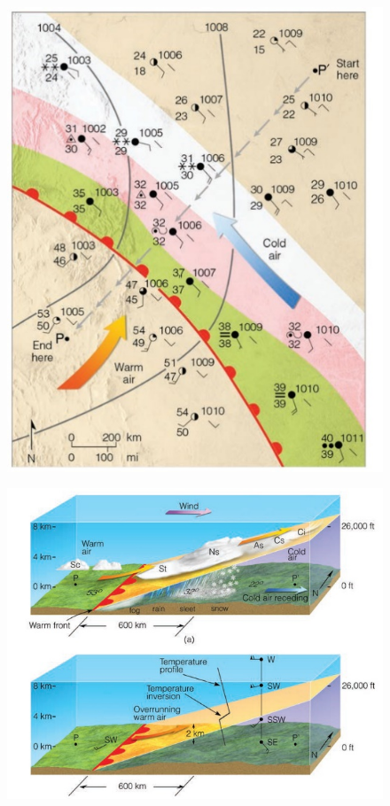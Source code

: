 \documentclass[12pt,oneside]{book}
\begin{document}
\begin{figure}

{\centering \includegraphics[width=0.8\linewidth]{figures/Figure624a} 

}

\caption{ }\label{fig:Fig624a}
\end{figure}

\begin{figure}

{\centering \includegraphics[width=0.8\linewidth]{figures/Figure624b} 

}

\caption{ }\label{fig:Fig624b}
\end{figure}
\end{document}
